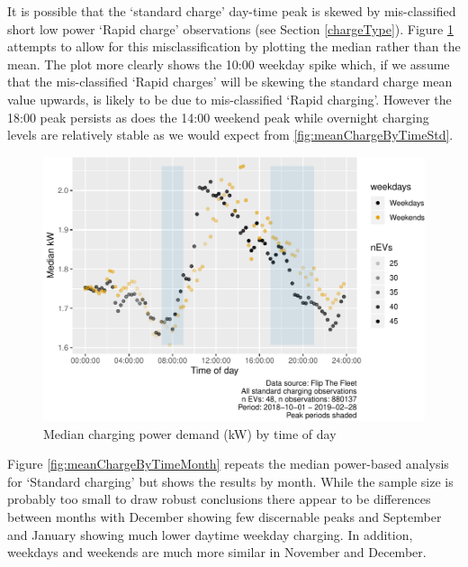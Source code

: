 \documentclass[]{article}
\begin{document}
It is possible that the `standard charge' day-time peak is skewed by mis-classified short low power `Rapid charge' observations (see Section \ref{chargeType}). Figure \ref{fig:medianChargeByTime} attempts to allow for this misclassification by plotting the median rather than the mean. The plot more clearly shows the 10:00 weekday spike which, if we assume that the mis-classified `Rapid charges' will be skewing the standard charge mean value upwards, is likely to be due to mis-classified `Rapid charging'. However the 18:00 peak persists as does the 14:00 weekend peak while overnight charging levels are relatively stable as we would expect from \ref{fig:meanChargeByTimeStd}.

\begin{figure}
\centering
\includegraphics{EVBB_report_v1_files/figure-latex/medianChargeByTime-1.pdf}
\caption{\label{fig:medianChargeByTime}Median charging power demand (kW) by time of day}
\end{figure}

Figure \ref{fig:meanChargeByTimeMonth} repeats the median power-based analysis for `Standard charging' but shows the results by month. While the sample size is probably too small to draw robust conclusions there appear to be differences between months with December showing few discernable peaks and September and January showing much lower daytime weekday charging. In addition, weekdays and weekends are much more similar in November and December.
\end{document}
